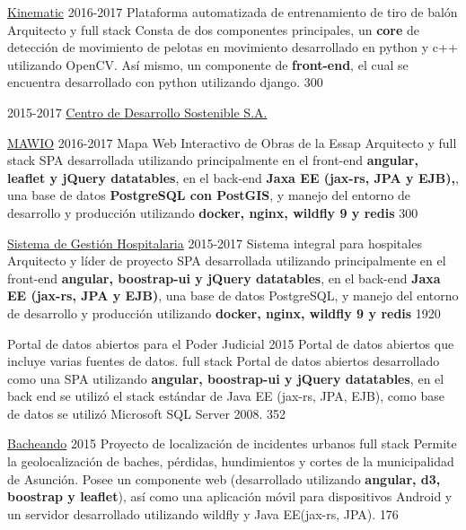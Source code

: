 \documentclass[]{friggeri-cv}
\begin{document}
\begin{entrylist}
{    \proyecto
        {\href{http://www.cds.com.py/productos/kinematics/}{Kinematic}}
        {2016-2017}
        {Plataforma automatizada de entrenamiento de tiro de balón}
        {Arquitecto y full stack}
        {Consta de dos componentes principales, un \textbf{core} de detección de movimiento de pelotas en movimiento desarrollado en python y c++ utilizando OpenCV. Así mismo, un componente de \textbf{front-end}, el cual se encuentra desarrollado con python utilizando django.}
        {300}
        
        
        
      }
      {}
    
  \entry
    {2015-2017}
    {\href{http://www.cds.com.py}{Centro de Desarrollo Sostenible S.A.}}
    {}
    {
    \proyecto
        {\href{https://mawio.net/}{MAWIO}}
        {2016-2017}
        {Mapa Web Interactivo de Obras de la Essap}
        {Arquitecto y full stack}
        {SPA desarrollada utilizando principalmente en el front-end \textbf{angular, leaflet y jQuery datatables}, en el back-end \textbf{Jaxa EE (jax-rs, JPA y EJB),}, una base de datos \textbf{PostgreSQL con PostGIS}, y manejo del entorno de desarrollo y producción utilizando \textbf{docker, nginx, wildfly 9 y redis}}
        {300}
        
    \proyecto
        {\href{http://www.cds.com.py/productos/sistemas-de-gestion/sistema-de-gestion-hospitalaria/}{Sistema de Gestión Hospitalaria}}
        {2015-2017}
        {Sistema integral para hospitales}
        {Arquitecto y líder de proyecto}
        {SPA desarrollada utilizando principalmente en el front-end 
        \textbf{angular, boostrap-ui y jQuery datatables}, en el back-end 
        \textbf{Jaxa EE (jax-rs, JPA y EJB)}, una base de datos PostgreSQL, 
        y manejo del entorno de desarrollo y producción utilizando 
        \textbf{docker, nginx, wildfly 9 y redis}}
        {1920}
        
    \proyecto
        {Portal de datos abiertos para el Poder Judicial}
        {2015}
        {Portal de datos abiertos que incluye varias fuentes de datos.}
        {full stack}
        {Portal de datos abiertos desarrollado como una SPA utilizando 
        \textbf{angular, boostrap-ui y jQuery datatables}, en el back end 
        se utilizó el stack estándar de Java EE (jax-rs, JPA, EJB), como base 
        de datos se utilizó Microsoft SQL Server 2008.}
        {352} 
        
    \proyecto
        {\href{http://bacheando.com/}{Bacheando}}
        {2015}
        {Proyecto de localización de incidentes urbanos}
        {full stack}
        {Permite la geolocalización de baches, pérdidas, hundimientos y
            cortes de la municipalidad de Asunción.
            Posee un componente web (desarrollado utilizando 
            \textbf{angular, d3, boostrap y leaflet}), así como una 
            aplicación móvil para dispositivos Android y un servidor desarrollado 
            utilizando wildfly y Java EE(jax-rs, JPA).}
        {176} 
        
}
\end{entrylist}
\end{document}
